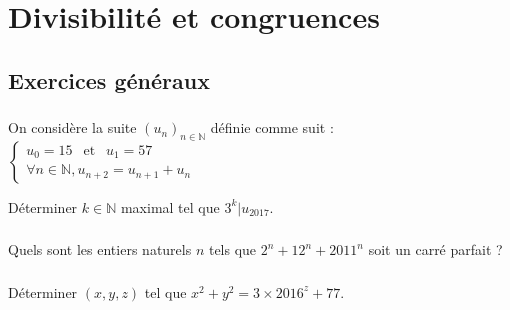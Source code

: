 
\chapter{Divisibilité et congruences}

	\section{Exercices généraux}

		\subsection{}

			On considère la suite $(u_n)_{n\in\mathbb{N}}$ définie comme suit : $
			\left\{ \begin{array}{l}
				u_0 = 15 ~~\text{ et } ~~ u_1 = 57 \\
				\forall n \in \mathbb{N}, u_{n+2} = u_{n+1} + u_n
			\end{array} \right. $

			Déterminer $k\in\mathbb{N}$ maximal tel que $3^k \vert u_{2017}$.
		
		\subsection{}

			Quels sont les entiers naturels $n$ tels que $2^n + 12^n + 2011^n$ soit un carré parfait ?

		\subsection{}

			Déterminer $(x,y,z)$ tel que $x^2 + y^2 = 3\times 2016^z + 77$.
	

